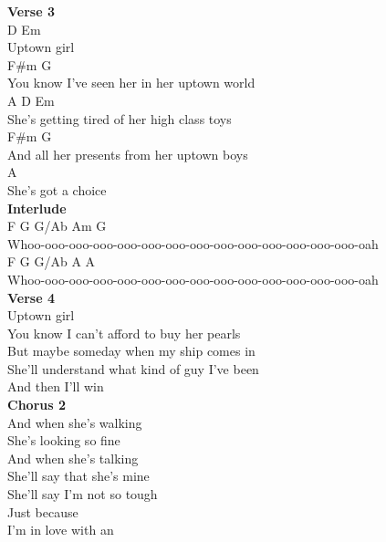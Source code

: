 \documentclass[a4paper]{article}
\begin{document}
{{        }
        \textbf{Verse 3}
        ~\\
        {
            \cutive
            \obeyspaces
D            Em
\\
Uptown girl
\\
                              F\#m           G
\\
You know I've seen her in her uptown world
\\
              A            D               Em
\\
She's getting tired of her high class toys
\\
                              F\#m            G
\\
And all her presents from her uptown boys
\\
            A
\\
She's got a choice
\\

        }
        \textbf{Interlude}
        ~\\
        {
            \cutive
            \obeyspaces
F            G               G/Ab            Am      G
\\
Whoo-ooo-ooo-ooo-ooo-ooo-ooo-ooo-ooo-ooo-ooo-ooo-ooo-ooo-oah
\\
F            G               G/Ab            A       A
\\
Whoo-ooo-ooo-ooo-ooo-ooo-ooo-ooo-ooo-ooo-ooo-ooo-ooo-ooo-oah
\\

        }
        \textbf{Verse 4}
        ~\\
        {
            \cutive
            \obeyspaces
Uptown girl
\\
You know I can't afford to buy her pearls
\\
But maybe someday when my ship comes in
\\
She'll understand what kind of guy I've been
\\
And then I'll win
\\

        }
        \textbf{Chorus 2}
        ~\\
        {
            \cutive
            \obeyspaces
And when she's walking
\\
She's looking so fine
\\
And when she's talking
\\
She'll say that she's mine
\\
She'll say I'm not so tough
\\
Just because
\\
I'm in love with an
\\

}}
\end{document}
